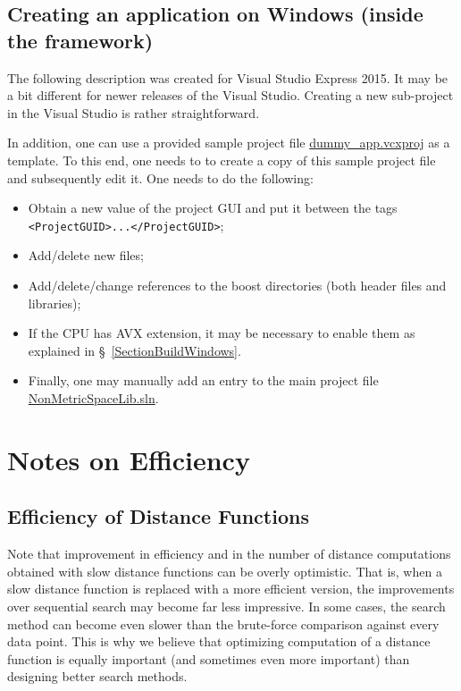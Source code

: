 \documentclass[runningheads,a4paper]{llncs}
\newcommand{\replocfile}{https://github.com/searchivarius/nmslib/blob/v1.5/}
\newcommand{\ttt}[1]{\texttt{#1}}
\begin{document}
\subsection{Creating an application on Windows (inside the framework)}\label{SectionCreateAppWindows}
The following description was created for Visual Studio Express 2015.
It may be a bit different for newer releases of the Visual Studio.
Creating a new sub-project in the Visual Studio is rather straightforward.

In addition, one can use a provided sample project file \href{\replocfile similarity_search/src/dummy_app.vcxproj}{dummy\_app.vcxproj} as a template.
To this end, one needs to to create a copy of this sample project file and subsequently edit it. 
One needs to do the following:
\begin{itemize}
\item Obtain a new value of the project GUI and put it between the tags \newline \ttt{<ProjectGUID>...</ProjectGUID>};
\item Add/delete new files; 
\item Add/delete/change references to the boost directories (both header files and libraries);
\item If the CPU has AVX extension, it may be necessary to enable them
as explained in \S~\ref{SectionBuildWindows}.
\item Finally, one may manually add an entry to the main project
file \href{\replocfile similarity_search/NonMetricSpaceLib.sln}{NonMetricSpaceLib.sln}.
\end{itemize}

\section{Notes on Efficiency}\label{SectionEfficiency}

\subsection{Efficiency of Distance Functions}
Note that improvement in efficiency and in the number of distance computations
obtained with slow distance functions can be overly optimistic.
That is, when a slow distance function is replaced with a more efficient version,
the improvements over sequential search may become far less impressive.
In some cases, the search method can become even slower than the brute-force
comparison against every data point.
This is why we believe that optimizing  computation of a distance function 
is equally important (and sometimes even more important) 
than designing better search methods.
\end{document}
